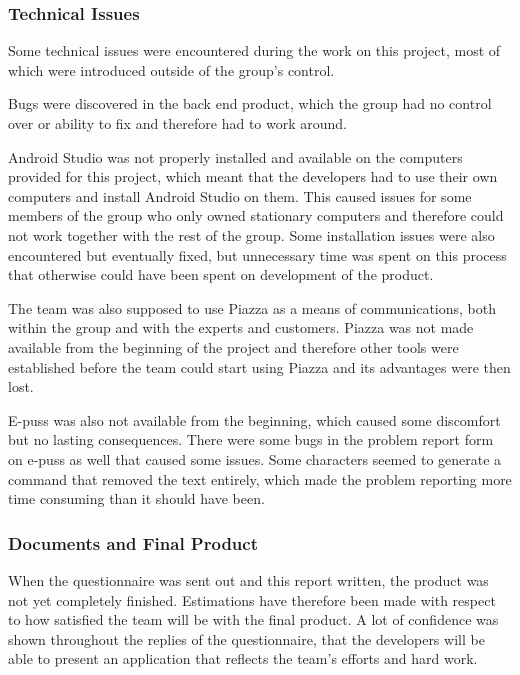 \documentclass[a4paper]{article}
\begin{document}

\subsubsection{Technical Issues}

Some technical issues were encountered during the work on this project, most of which were introduced outside of the group's control.

Bugs were discovered in the back end product, which the group had no control over or ability to fix and therefore had to work around.

Android Studio was not properly installed and available on the computers provided for this project, which meant that the developers had to use their own computers and install Android Studio on them. This caused issues for some members of the group who only owned stationary computers and therefore could not work together with the rest of the group. Some installation issues were also encountered but eventually fixed, but unnecessary time was spent on this process that otherwise could have been spent on development of the product.

The team was also supposed to use Piazza as a means of communications, both within the group and with the experts and customers. Piazza was not made available from the beginning of the project and therefore other tools were established before the team could start using Piazza and its advantages were then lost.

E-puss was also not available from the beginning, which caused some discomfort but no lasting consequences. There were some bugs in the problem report form on e-puss as well that caused some issues. Some characters seemed to generate a command that removed the text entirely, which made the problem reporting more time consuming than it should have been. 


\subsubsection{Documents and Final Product}
When the questionnaire was sent out and this report written, the product was not yet completely finished. Estimations have therefore been made with respect to how satisfied the team will be with the final product. A lot of confidence was shown throughout the replies of the questionnaire, that the developers will be able to present an application that reflects the team's efforts and hard work. 
\end{document}
